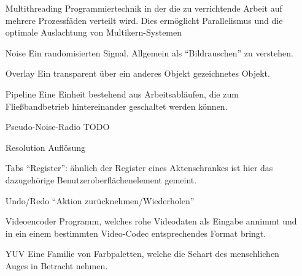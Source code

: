 \begin{itemize}
    \item[Multithreading] Programmiertechnik in der die zu verrichtende Arbeit auf mehrere Prozessfäden verteilt wird. Dies ermöglicht Parallelismus und die optimale Auslachtung von Multikern-Systemen
    \item[Noise] Ein randomisierten Signal. Allgemein als ``Bildrauschen'' zu verstehen.
    \item[Overlay] Ein transparent über ein anderes Objekt gezeichnetes Objekt.
    \item[Pipeline] Eine Einheit bestehend aus Arbeitsabläufen, die zum Fließbandbetrieb hintereinander geschaltet werden können.
    \item[Pseudo-Noise-Radio] TODO %
    \item[Resolution] Auflösung
    \item[Tabs] ``Register'': ähnlich der Register eines Aktenschrankes ist hier das dazugehörige Benutzeroberflächenelement gemeint.
    \item[Undo/Redo] ``Aktion zurücknehmen/Wiederholen''
    \item[Videoencoder] Programm, welches rohe Videodaten als Eingabe annimmt und in ein einem bestimmten Video-Codec entsprechendes Format bringt.
    \item[YUV] Eine Familie von Farbpaletten, welche die Sehart des menschlichen Auges in Betracht nehmen.
\end{itemize}
